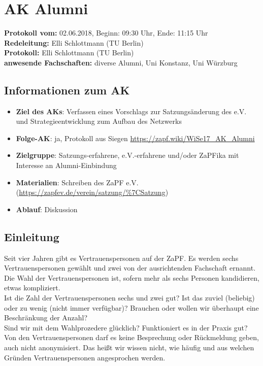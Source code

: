 
\section{AK Alumni}

  \textbf{Protokoll vom:} 02.06.2018,
  Beginn: 09:30 Uhr,
  Ende: 11:15 Uhr \\
  \textbf{Redeleitung:} Elli Schlottmann (TU Berlin) \\
  \textbf{Protokoll:} Elli Schlottmann (TU Berlin) \\
  \textbf{anwesende Fachschaften:} diverse Alumni, Uni Konstanz, Uni Würzburg

  \subsection*{Informationen zum AK}
    \begin{itemize}
      \item \textbf{Ziel des AKs}: Verfassen eines Vorschlags zur Satzungsänderung des e.V. und Strategieentwicklung zum Aufbau des Netzwerks
      \item \textbf{Folge-AK}: ja, Protokoll aus Siegen \url{https://zapf.wiki/WiSe17_AK_Alumni}
      \item \textbf{Zielgruppe}: Satzungs-erfahrene, e.V.-erfahrene und/oder ZaPFika mit Interesse an Alumni-Einbindung
      \item \textbf{Materialien}: Schreiben des ZaPF e.V. (\url{https://zapfev.de/verein/satzung/%7CSatzung})
      \item \textbf{Ablauf}: Diskussion
    \end{itemize}

  \subsection*{Einleitung}
Seit vier Jahren gibt es Vertrauenspersonen auf der ZaPF. Es werden sechs Vertrauenspersonen gewählt und zwei von der ausrichtenden Fachschaft ernannt. Die Wahl der Vertrauenspersonen ist, sofern mehr als sechs Personen kandidieren, etwas kompliziert. \\ 

    Ist die Zahl der Vertrauenspersonen sechs und zwei gut? Ist das zuviel (beliebig) oder zu wenig (nicht immer verfügbar)? Brauchen oder wollen wir überhaupt eine Beschränkung der Anzahl? \\
    Sind wir mit dem Wahlprozedere glücklich? Funktioniert es in der Praxis gut? \\
    Von den Vertrauenspersonen darf es keine Besprechung oder Rückmeldung geben, auch nicht anonymisiert. Das heißt wir wissen nicht, wie häufig und aus welchen Gründen Vertrauenspersonen angesprochen werden. \\ 

